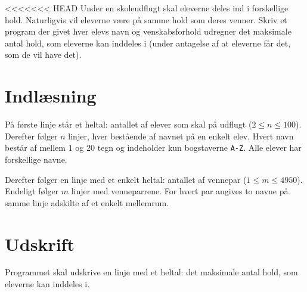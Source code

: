 
<<<<<<< HEAD
Under en skoleudflugt skal eleverne deles ind i forskellige hold.
Naturligvis vil eleverne være på samme hold som deres venner.
Skriv et program der givet hver elevs navn og venskabsforhold udregner det maksimale antal hold, som eleverne kan inddeles i (under antagelse af at eleverne får det, som de vil have det).

\section*{Indlæsning}

På første linje står et heltal: antallet af elever som skal på udflugt ($2 \le n \le 100$).
Derefter følger $n$ linjer, hver bestående af navnet på en enkelt elev.
Hvert navn består af mellem $1$ og $20$ tegn og indeholder kun bogstaverne \texttt{A-Z}.
Alle elever har forskellige navne.

Derefter følger en linje med et enkelt heltal: antallet af vennepar ($1 \le m \le 4950$).
Endeligt følger $m$ linjer med venneparrene.
For hvert par angives to navne på samme linje adskilte af et enkelt mellemrum.

\section*{Udskrift}
Programmet skal udskrive en linje med et heltal: det maksimale antal hold, som eleverne kan inddeles i.
